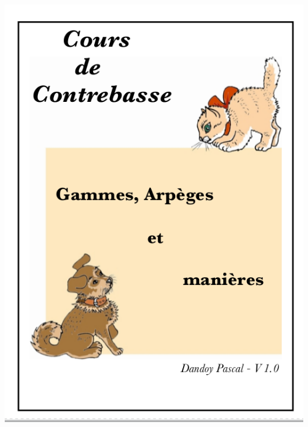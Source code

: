 \documentclass[a4paper]{book}
\begin{document}
\begin{center}
\includegraphics[width=14.312cm,height=20.025cm]{lebluessupportsmethodes-img178.png}
\end{center}
\end{document}
